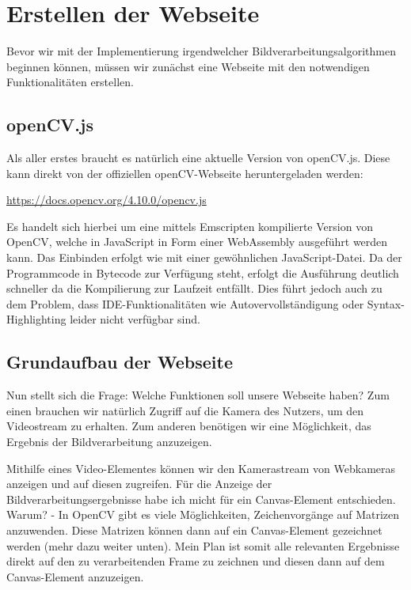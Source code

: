 \section{Erstellen der Webseite}
Bevor wir mit der Implementierung irgendwelcher Bildverarbeitungsalgorithmen beginnen können, müssen wir zunächst eine Webseite mit den notwendigen Funktionalitäten erstellen.

\subsection{openCV.js}
Als aller erstes braucht es natürlich eine aktuelle Version von openCV.js. Diese kann direkt von der offiziellen openCV-Webseite heruntergeladen werden:

\href{https://docs.opencv.org/4.10.0/opencv.js}{https://docs.opencv.org/4.10.0/opencv.js}

Es handelt sich hierbei um eine mittels Emscripten kompilierte Version von OpenCV, welche in JavaScript in Form einer WebAssembly ausgeführt werden kann. Das Einbinden erfolgt wie mit einer gewöhnlichen JavaScript-Datei. Da der Programmcode in Bytecode zur Verfügung steht, erfolgt die Ausführung deutlich schneller da die Kompilierung zur Laufzeit entfällt. Dies führt jedoch auch zu dem Problem, dass IDE-Funktionalitäten wie Autovervollständigung oder Syntax-Highlighting leider nicht verfügbar sind.

\subsection{Grundaufbau der Webseite}
Nun stellt sich die Frage: Welche Funktionen soll unsere Webseite haben? Zum einen brauchen wir natürlich Zugriff auf die Kamera des Nutzers, um den Videostream zu erhalten. Zum anderen benötigen wir eine Möglichkeit, das Ergebnis der Bildverarbeitung anzuzeigen.

Mithilfe eines Video-Elementes können wir den Kamerastream von Webkameras anzeigen und auf diesen zugreifen. Für die Anzeige der Bildverarbeitungsergebnisse habe ich micht für ein Canvas-Element entschieden. Warum? - In OpenCV gibt es viele Möglichkeiten, Zeichenvorgänge auf Matrizen anzuwenden. Diese Matrizen können dann auf ein Canvas-Element gezeichnet werden (mehr dazu weiter unten). Mein Plan ist somit alle relevanten Ergebnisse direkt auf den zu verarbeitenden Frame zu zeichnen und diesen dann auf dem Canvas-Element anzuzeigen.

